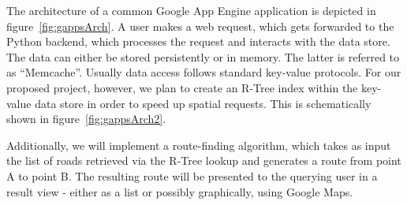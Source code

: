 \documentclass{scrartcl}
\begin{document}
The architecture of a common Google App Engine application is depicted in figure~\ref{fig:gappsArch}. A user makes a web request, which gets forwarded to the Python backend, which processes the request and interacts with the data store. The data can either be stored persistently or in memory. The latter is referred to as ``Memcache''. Usually data access follows standard key-value protocols. For our proposed project, however, we plan to create an R-Tree index within the key-value data store in order to speed up spatial requests. This is schematically shown in figure~\ref{fig:gappsArch2}.

Additionally, we will implement a route-finding algorithm, which takes as input the list of roads retrieved via the R-Tree lookup and generates a route from point A to point B. The resulting route will be presented to the querying user in a result view - either as a list or possibly graphically, using Google Maps.



\end{document}
